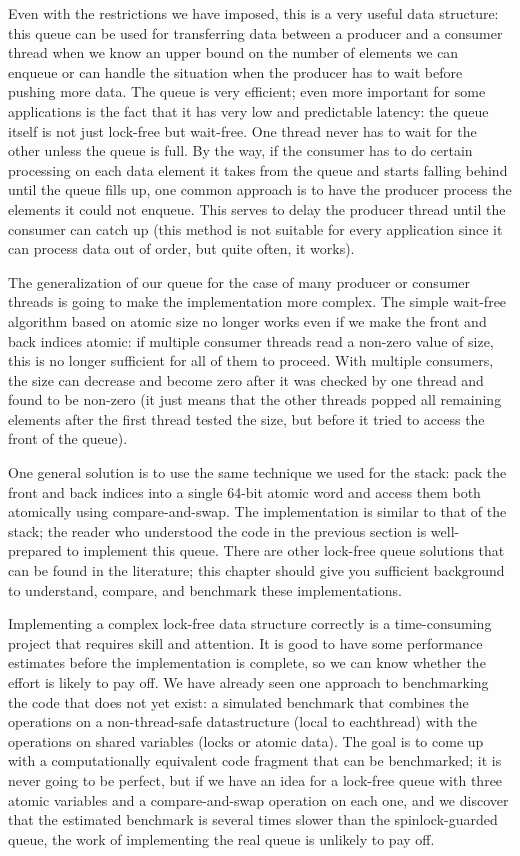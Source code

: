 Even with the restrictions we have imposed, this is a very useful data structure: this queue can be used for transferring data between a producer and a consumer thread when we know an upper bound on the number of elements we can enqueue or can handle the situation when the producer has to wait before pushing more data. The queue is very efficient; even more important for some applications is the fact that it has very low and predictable latency: the queue itself is not just lock-free but wait-free. One thread never has to wait for the other unless the queue is full. By the way, if the consumer has to do certain processing on each data element it takes from the queue and starts falling behind until the queue fills up, one common approach is to have the producer process the elements it could not enqueue. This serves to delay the producer thread until the consumer can catch up (this method is not suitable for every application since it can process data out of order, but quite often, it works).

The generalization of our queue for the case of many producer or consumer threads is going to make the implementation more complex. The simple wait-free algorithm based on atomic size no longer works even if we make the front and back indices atomic: if multiple consumer threads read a non-zero value of size, this is no longer sufficient for all of them to proceed. With multiple consumers, the size can decrease and become zero after it was checked by one thread and found to be non-zero (it just means that the other threads popped all remaining elements after the first thread tested the size, but before it tried to access the front of the queue).

One general solution is to use the same technique we used for the stack: pack the front and back indices into a single 64-bit atomic word and access them both atomically using compare-and-swap. The implementation is similar to that of the stack; the reader who understood the code in the previous section is well-prepared to implement this queue. There are other lock-free queue solutions that can be found in the literature; this chapter should give you sufficient background to understand, compare, and benchmark these implementations.

Implementing a complex lock-free data structure correctly is a time-consuming project that requires skill and attention. It is good to have some performance estimates before the implementation is complete, so we can know whether the effort is likely to pay off. We have already seen one approach to benchmarking the code that does not yet exist: a simulated benchmark that combines the operations on a non-thread-safe datastructure (local to eachthread) with the operations on shared variables (locks or atomic data). The goal is to come up with a computationally equivalent code fragment that can be benchmarked; it is never going to be perfect, but if we have an idea for a lock-free queue with three atomic variables and a compare-and-swap operation on each one, and we discover that the estimated benchmark is several times slower than the spinlock-guarded queue, the work of implementing the real queue is unlikely to pay off.

